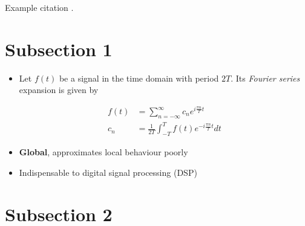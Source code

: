 Example citation \cite{Ignjatovic2009}.


\section{Subsection 1} %

\begin{itemize}
	\item Let $f(t)$ be a signal in the time domain with period $2T$. Its 
		\textit{Fourier series}  expansion is given by

		\begin{align}
			f(t)	&= \sum_{n=-\infty}^{\infty} c_n e^{i \frac{\pi n}{T} t} \\
			c_n		&= \frac{1}{2T} \int_{-T}^{T} f(t) e^{-i \frac{\pi n}{T} t} dt
		\end{align}
	\item \textbf{Global}, approximates local behaviour poorly
	\item Indispensable to digital signal processing (DSP)
\end{itemize}

\lipsum[1] %


\section{Subsection 2} %

\lipsum[2] %


